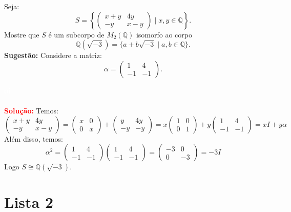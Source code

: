 \documentclass[11pt,a4paper]{article}
\newcounter{exercicio}[section]
\newcommand{\solucao}[1]{
\textbf{\textcolor{white}{oi}\\ \\ \textcolor{red}{Solução:}} #1}
\begin{document}
 Seja:
\[
S=\left\{\begin{pmatrix}
x+y&4y\\-y&x-y
\end{pmatrix}\mid x,y\in\mathbb{Q}\right\}.
\]
Mostre que $S$ é um subcorpo de $M_2(\mathbb{Q})$ isomorfo ao corpo
\[
\mathbb{Q}(\sqrt{-3})=\{a+b\sqrt{-3}\mid a,b\in\mathbb{Q}\}.
\]
\textbf{Sugestão:} Considere a matriz:
\[
\alpha=\begin{pmatrix}
1&4\\-1&-1
\end{pmatrix}.
\]
\solucao{Temos:
\[
\begin{pmatrix}
x+y&4y\\-y&x-y
\end{pmatrix}
=\begin{pmatrix}
x&0\\0&x
\end{pmatrix}+\begin{pmatrix}
y&4y\\-y&-y
\end{pmatrix}=
x\begin{pmatrix}
1&0\\0&1
\end{pmatrix}+y\begin{pmatrix}
1&4\\-1&-1
\end{pmatrix}=xI+y\alpha
\]
Além disso, temos:
\[
\alpha^2=\begin{pmatrix}
1&4\\-1&-1
\end{pmatrix}\begin{pmatrix}
1&4\\-1&-1
\end{pmatrix}=\begin{pmatrix}
-3&0\\0&-3
\end{pmatrix}=-3I
\]
Logo $S\cong\mathbb{Q}(\sqrt{-3})$.
}
\newpage
\section{\textcolor{Floresta}{Lista 2}}
\end{document}
